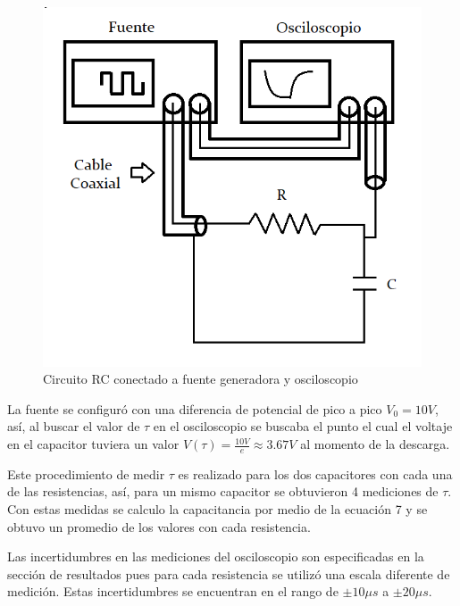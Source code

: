 \documentclass[10pt,letter]{article}
\begin{document}
\begin{multicols}{2}
\begin{figure}[H]
\centering
\includegraphics[scale=0.4]{Circuito}
\caption{Circuito RC conectado a fuente generadora y osciloscopio}
\label{RCcarga}
\end{figure}


La fuente se configuró con una diferencia de potencial de pico a pico $V_0=10V$, así, al buscar el valor de $\tau$ en el osciloscopio se buscaba el punto el cual el voltaje en el capacitor tuviera un valor $V(\tau)=\frac{10V}{e}\approx3.67V$ al momento de la descarga.

\vspace{0.2cm}

Este procedimiento de medir $\tau$ es realizado para los dos capacitores con cada una de las resistencias, así, para un mismo capacitor se obtuvieron 4 mediciones de $\tau$. Con estas medidas se calculo la capacitancia por medio de la ecuación 7 y se obtuvo un promedio de los valores con cada resistencia. 

\vspace{0.2cm}

Las incertidumbres en las mediciones del osciloscopio son especificadas en la sección de resultados pues para cada resistencia se utilizó una escala diferente de medición. Estas incertidumbres se encuentran en el rango de $\pm 10\mu s$ a $\pm 20 \mu s$.



\end{multicols}
\end{document}
